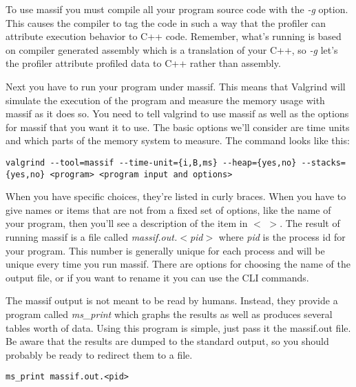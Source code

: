 \documentclass[]{tufte-handout}
\begin{document}
To use massif you must compile all your program source code with the \textit{-g} option.  This causes the compiler to tag the code in such a way that the profiler can attribute execution behavior to C++ code.  Remember, what's running is based on compiler generated assembly which is a translation of your C++, so  \textit{-g} let's the profiler attribute profiled data to C++ rather than assembly.  

Next you have to run your program under massif. This means that Valgrind will simulate the execution of the program and measure the memory usage with massif as it does so. You need to tell valgrind to use massif as well as the options for massif that you want it to use.  The basic options we'll consider are time units and which parts of the memory system to measure. The command looks like this:
\begin{verbatim}
valgrind --tool=massif --time-unit={i,B,ms} --heap={yes,no} --stacks={yes,no} <program> <program input and options>
\end{verbatim}
When you have specific choices, they're listed in curly braces. When you have to give names or items that are not from a fixed set of options, like the name of your program, then you'll see a description of the item in $<$ $>$.  The result of running massif is a file called \textit{massif.out.$<$pid$>$} where \textit{pid} is the process id for your program.  This number is generally unique for each process and will be unique every time you run massif.  There are options for choosing the name of the output file, or if you want to rename it you can use the CLI commands. 

The massif output is not meant to be read by humans. Instead, they provide a program called \textit{ms\_print} which graphs the results as well as produces several tables worth of data. Using this program is simple, just pass it the massif.out file. Be aware that the results are dumped to the standard output, so you should probably be ready to redirect them to a file.
\begin{verbatim}
ms_print massif.out.<pid>
\end{verbatim}
\end{document}
